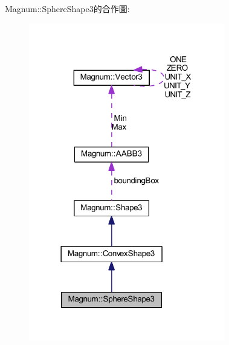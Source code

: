 Magnum\+:\+:Sphere\+Shape3的合作圖\+:\nopagebreak
\begin{figure}[H]
\begin{center}
\leavevmode
\includegraphics[width=242pt]{class_magnum_1_1_sphere_shape3__coll__graph}
\end{center}
\end{figure}
